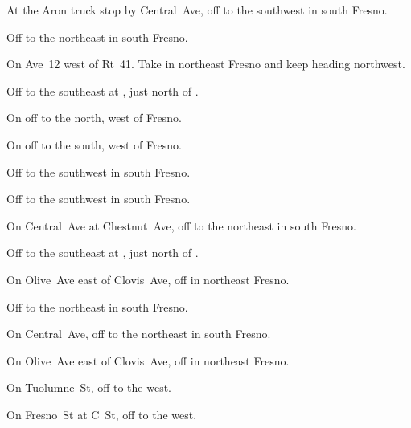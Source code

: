 
\begin{LocationList}

At the Aron truck stop by Central~Ave, off   to the southwest in south Fresno.

Off   to the northeast in south Fresno.

On Ave~12 west of Rt~41.
Take   in northeast Fresno and keep heading northwest.

Off  to the southeast at , just north of .

On  off  to the north, west of Fresno.

On  off  to the south, west of Fresno.

Off   to the southwest in south Fresno.

\Location{\GarageHQ \Garage}
Off   to the southwest in south Fresno.

On Central~Ave at Chestnut~Ave, off   to the northeast in south Fresno.

Off  to the southeast at , just north of .

On Olive~Ave east of Clovis~Ave, off   in northeast Fresno.

Off   to the northeast in south Fresno.

\Location{\RecruitmentAgency \Recruitment}
On Central~Ave, off   to the northeast in south Fresno.

On Olive~Ave east of Clovis~Ave, off   in northeast Fresno.

On Tuolumne~St, off   to the west.

On Fresno~St at C~St, off   to the west.

\end{LocationList}
